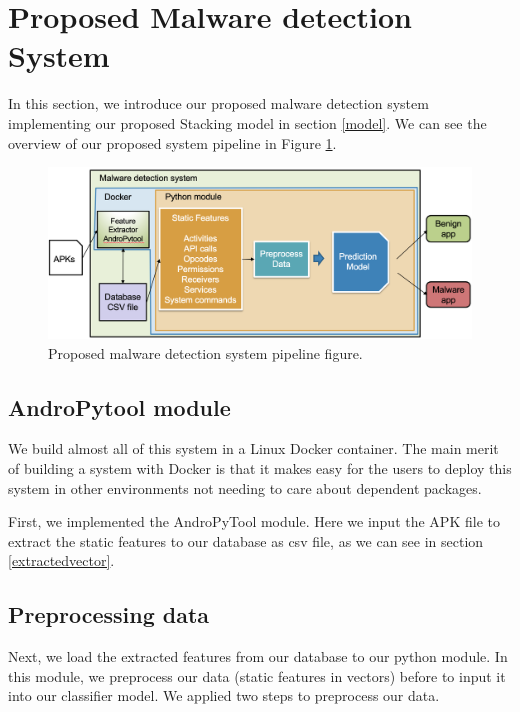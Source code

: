\section{Proposed Malware detection System}
In this section, we introduce our proposed malware detection system implementing our proposed Stacking model in section \ref{model}. We can see the overview of our proposed system pipeline in Figure \ref{fig:systempip}.

\begin{figure}[htbp]
    \centering
    \includegraphics[width=\textwidth]{./Figure/systempip.png}
    \caption{Proposed malware detection system pipeline figure.}
    \label{fig:systempip}
\end{figure}

\subsection{AndroPytool module}

We build almost all of this system in a Linux Docker container. The main merit of building a system with Docker is that it makes easy for the users to deploy this system in other environments not needing to care about dependent packages. 

First, we implemented the AndroPyTool\cite{andropytool} module. Here we input the APK file to extract the static features to our database as \ac{csv} file, as we can see in section \ref{extractedvector}.  

\subsection{Preprocessing data}

Next, we load the extracted features from our database to our python module.
In this module, we preprocess our data (static features in vectors) before to input it into our classifier model. We applied two steps to preprocess our data.

